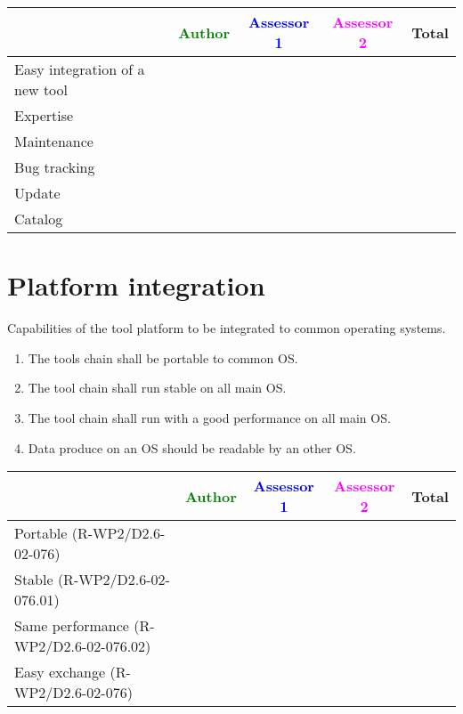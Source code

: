 \begin{tabular}{|l | c | c | c | c|}
\hline
& \textcolor{green}{Author} & \textcolor{blue}{Assessor 1} & \textcolor{magenta}{Assessor 2} & Total \\
\hline Easy integration of a new tool &
  &                 &                  &\\
\hline Expertise &
  &                 &                  &\\
\hline Maintenance &
  &                 &                  &\\
\hline Bug tracking &
  &                 &                  &\\
\hline Update &
  &                 &                  &\\
\hline  Catalog &
  &                 &                  &\\
\hline
\end{tabular}


\section{Platform integration}
Capabilities of the tool platform to  be integrated to common operating systems.
\begin{enumerate}
\item  The tools chain shall be portable to common \gls{OS}.
\item   The tool chain shall run stable on all main \gls{OS}.
\item  The tool chain shall run with a good performance on all main \gls{OS}.
\item  Data produce on an \gls{OS} should be readable by an other \gls{OS}.
\end{enumerate}
\begin{tabular}{|l | c | c | c | c|}
  \hline
  & \textcolor{green}{Author} & \textcolor{blue}{Assessor 1} &  \textcolor{magenta}{Assessor 2} & Total \\
  \hline  Portable (R-WP2/D2.6-02-076) &
  &                 &                  &\\
  \hline   Stable (R-WP2/D2.6-02-076.01)&
  &                 &                  &\\
  \hline   Same performance (R-WP2/D2.6-02-076.02)&
  &                 &                  &\\
  \hline  Easy exchange (R-WP2/D2.6-02-076)&
  &                 &                  &\\
  \hline
\end{tabular}


